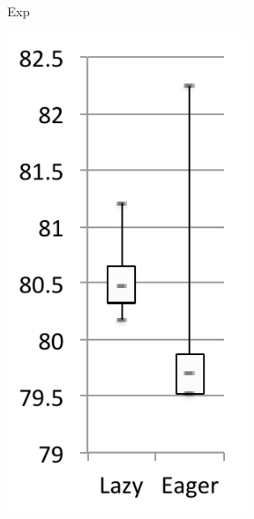 \documentclass[sigplan,10pt,screen]{acmart}\settopmatter{printfolios=true,printccs=true,printacmref=true}
\begin{document}
\begin{figure}[bth]
\begin{subfigure}[b]{.48\textwidth}
\begin{subfigure}[b]{.28\textwidth}
		\caption{Exp}
   	\end{subfigure}\hspace{.03\textwidth}%
	\begin{subfigure}[b]{.28\textwidth}
		\includegraphics[width=\linewidth]{figures/netBeansExpCacheExecTime} 

\end{subfigure}
\end{subfigure}
\end{figure}
\end{document}
